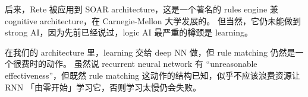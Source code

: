 \documentclass[orivec]{article}
\newcommand{\cc}[2]{#1}
\newcommand{\cc}[2]{#2}
\begin{document}
\cc{
后来，Rete 被应用到 SOAR architecture，这是一个著名的 rules engine 兼 cognitive architecture，在 Carnegie-Mellon 大学发展的。 但当然，它仍未能做到 strong AI，因为先前已经说过，logic AI 最严重的樽颈是 learning。 }{
Later, Rete is employed in the SOAR architecture, a famous cognitive architecture cum rule engine, developed in Carnegie-Mellon University.  Of course, SOAR did not achieve AGI, as I explained earlier, the Achilles' heel is in learning.
}

\cc{
在我们的 architecture 里，learning 交给 deep NN 做，但 rule matching 仍然是一个很费时的动作。  虽然说 recurrent neural network 有 ``unreasonable effectiveness''，但既然 rule matching 这动作的结构已知，似乎不应该浪费资源让 RNN 「由零开始」学习它，否则学习太慢仍会失败。 }{
In our architecture, learning is delegated to the deep NN, but rule matching is still a very time-consuming operation.  Even if one believes in the ``unreasonable effectiveness'' of recurrent neural networks, there is a strong reason to implement rule matching explicitly, instead of letting the RNN learn it from scratch, which could still be too slow.
}
\end{document}
